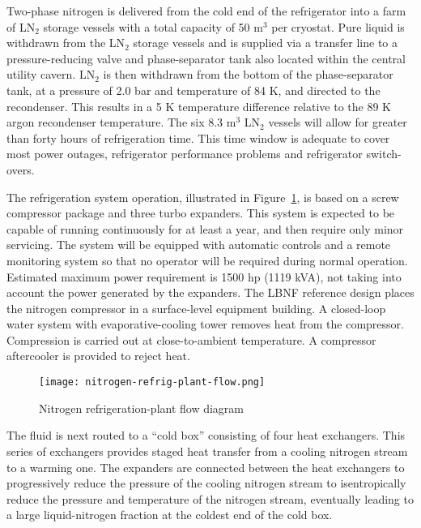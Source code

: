 Two-phase nitrogen is delivered from the cold end of the refrigerator 
into a farm of  LN$_2$ storage vessels with a total capacity of 50 m$^3$ per cryostat. 
Pure liquid is withdrawn from the LN$_2$ storage vessels and is supplied 
via a transfer line to a pressure-reducing valve and phase-separator tank 
also located within the central utility cavern. LN$_2$ is then withdrawn from the bottom 
of the phase-separator tank, at a pressure of 2.0 bar and temperature of 
84 K, and directed to the recondenser. This results in a 5 K temperature 
difference relative to the 89 K argon recondenser temperature. The 
six 8.3 m$^3$ LN$_2$ vessels will allow for greater than forty hours 
of refrigeration time. This time window is adequate to cover most power 
outages, refrigerator performance problems and refrigerator switch-overs.

The refrigeration system operation, illustrated in Figure~\ref{fig:LN2-refrigerator-flow}, 
is based on a screw compressor package and three turbo expanders. 
This system is expected to be capable of running  
continuously for at least a year, and then require only 
minor servicing. The system will be equipped with 
automatic controls and a remote monitoring system so that no operator 
will be required during normal operation. 
Estimated maximum power requirement is 1500 hp (1119 kVA), 
not taking into account the power generated by the expanders.  
The LBNF reference design places the nitrogen compressor in 
a surface-level equipment building. A closed-loop water system 
with evaporative-cooling tower removes heat from the compressor. 
Compression is carried out at close-to-ambient temperature. 
A compressor aftercooler is provided to reject heat. 

\begin{figure}[htbp]
\centering
\texttt{[image: nitrogen-refrig-plant-flow.png]}
\caption{Nitrogen refrigeration-plant flow diagram}
\label{fig:LN2-refrigerator-flow}
\end{figure}

The fluid is next routed to a ``cold box'' consisting of four heat exchangers.  
This series of exchangers provides staged heat transfer from a cooling 
nitrogen stream to a warming one.  The expanders are connected between 
the heat exchangers to progressively reduce the pressure of the cooling 
nitrogen stream to isentropically reduce the pressure and temperature of the
nitrogen stream, eventually leading to a large liquid-nitrogen fraction 
at the coldest end of the cold box. 

